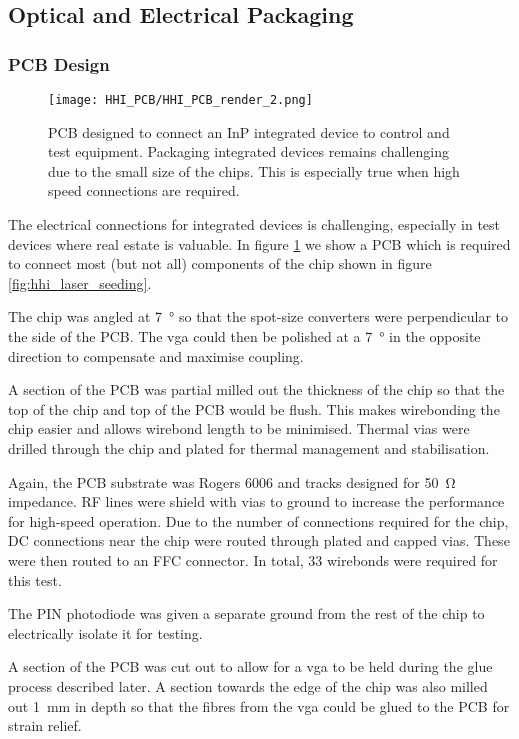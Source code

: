 \subsection{Optical and Electrical Packaging}

\subsubsection*{PCB Design}

\begin{figure}[tbp]
	\centering
	\texttt{[image: HHI\_PCB/HHI\_PCB\_render\_2.png]}
	\caption[PCB breakout for an InP integrated circuit]{PCB designed to connect an \ac{InP} integrated device to control and test equipment. Packaging integrated devices remains challenging due to the small size of the chips. This is especially true when high speed connections are required.}
	\label{fig:hhi_pcb}
\end{figure}

The electrical connections for integrated devices is challenging, especially in test devices where real estate is valuable. In figure \ref{fig:hhi_pcb} we show a PCB which is required to connect most (but not all) components of the chip shown in figure \ref{fig:hhi_laser_seeding}. 

The chip was angled at \SI{7}{\degree} so that the spot-size converters were perpendicular to the side of the PCB. The \ac{vga} could then be polished at a \SI{7}{\degree} in the opposite direction to compensate and maximise coupling.

A section of the PCB was partial milled out the thickness of the chip so that the top of the chip and top of the PCB would be flush. This makes wirebonding the chip easier and allows wirebond length to be minimised. Thermal vias were drilled through the chip and plated for thermal management and stabilisation. 

Again, the PCB substrate was Rogers 6006 and tracks designed for \SI{50}{\ohm} impedance. RF lines were shield with vias to ground to increase the performance for high-speed operation. Due to the number of connections required for the chip, DC connections near the chip were routed through plated and capped vias. These were then routed to an FFC connector. In total, 33 wirebonds were required for this test.

The PIN photodiode was given a separate ground from the rest of the chip to electrically isolate it for testing.

A section of the PCB was cut out to allow for a \ac{vga} to be held during the glue process described later. A section towards the edge of the chip was also milled out \SI{1}{mm} in depth so that the fibres from the \ac{vga} could be glued to the PCB for strain relief.

